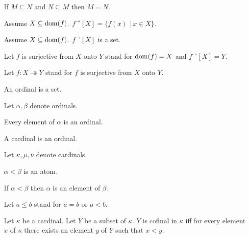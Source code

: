 \documentclass{article}
\newcommand{\image}[2]{#1^{\to}[#2]}
\newcommand{\surjects}{\twoheadrightarrow}
\begin{document}
\begin{forthel}
    \begin{axiom}[Extensionality]
      If $M\subseteq N$ and $N\subseteq M$ then $M = N$.
    \end{axiom}

    \begin{definition}
      Assume $X\subseteq \operatorname{dom}(f)$.
      $\image{f}{X} = \{f(x) \mid x \in X\}$.
    \end{definition}

    \begin{axiom}
      Assume $X\subseteq \operatorname{dom}(f)$.
      $\image{f}{X}$ is a set.
    \end{axiom}

    Let $f$ is surjective from $X$ onto $Y$ stand for $\operatorname{dom}(f) = X$ and $\image{f}{X} = Y$.

    Let $f : X \surjects Y$ stand for $f$ is surjective from $X$ onto $Y$.

    \begin{signature}
      An ordinal is a set.
    \end{signature}

    Let $\alpha, \beta$ denote ordinals.

    \begin{axiom}
      Every element of $\alpha$ is an ordinal.
    \end{axiom}

    \begin{signature}
      A cardinal is an ordinal.
    \end{signature}

    Let $\kappa, \mu, \nu$ denote cardinals.

    \begin{signature}
      $\alpha < \beta$ is an atom.
    \end{signature}

    \begin{axiom}
      If $\alpha < \beta$ then $\alpha$ is an element of $\beta$.
    \end{axiom}

    Let $a \leq b$ stand for $a = b$ or $a < b$.

    \begin{definition}[Cofinality]
      Let $\kappa$ be a cardinal.
      Let $Y$ be a subset of $\kappa$.
      $Y$ is cofinal in $\kappa$ iff
        for every element $x$ of $\kappa$ there exists an element $y$ of $Y$ such that $x < y$.
    \end{definition}


\end{forthel}
\end{document}
